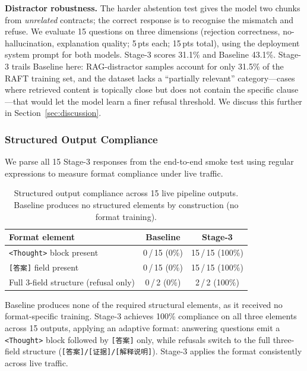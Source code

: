 \noindent\textbf{Distractor robustness.}
The harder abstention test gives the model two chunks from \emph{unrelated}
contracts; the correct response is to recognise the mismatch and refuse.
We evaluate 15 questions on three dimensions (rejection correctness,
no-hallucination, explanation quality; 5\,pts each; 15\,pts total),
using the deployment system prompt for both models.
Stage-3 scores 31.1\% and Baseline 43.1\%.
Stage-3 trails Baseline here: RAG-distractor samples account for only 31.5\%
of the RAFT training set, and the dataset lacks a ``partially relevant''
category---cases where retrieved content is topically close but does not
contain the specific clause---that would let the model learn a finer refusal
threshold.
We discuss this further in Section~\ref{sec:discussion}.

\subsubsection{Structured Output Compliance}

We parse all 15 Stage-3 responses from the end-to-end smoke test using
regular expressions to measure format compliance under live traffic.

\begin{table}[htbp]
\centering
\caption{Structured output compliance across 15 live pipeline outputs.
Baseline produces no structured elements by construction (no format training).}
\label{tab:format}
\small
\begin{tabular}{@{}lcc@{}}
\toprule
Format element & Baseline & Stage-3 \\
\midrule
\texttt{<Thought>} block present      & 0\,/\,15 (0\%) & 15\,/\,15 (100\%) \\
\texttt{[答案]} field present          & 0\,/\,15 (0\%) & 15\,/\,15 (100\%) \\
Full 3-field structure (refusal only) & 0\,/\,2\hphantom{0} (0\%) & \phantom{0}2\,/\,2\hphantom{0} (100\%) \\
\bottomrule
\end{tabular}
\end{table}

Baseline produces none of the required structural elements, as it received no
format-specific training.
Stage-3 achieves 100\% compliance on all three elements across 15 outputs,
applying an adaptive format: answering questions emit a \texttt{<Thought>}
block followed by \texttt{[答案]} only, while refusals switch to the full
three-field structure (\texttt{[答案]/[证据]/[解释说明]}).
Stage-3 applies the format consistently across live traffic.

